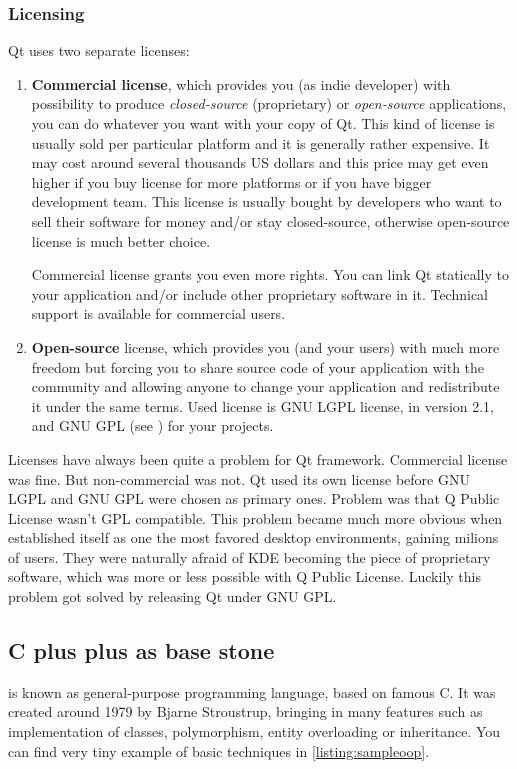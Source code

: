 \subsubsection{Licensing}
Qt uses two separate licenses:
\begin{enumerate}
\item \textbf{Commercial license}, which provides you (as indie developer) with possibility to produce \textit{closed-source} (proprietary) or \textit{open-source} applications, you can do whatever you want with your copy of Qt. This kind of license is usually sold per particular platform and it is generally rather expensive. It may cost around several thousands US dollars and this price may get even higher if you buy license for more platforms or if you have bigger development team. This license is usually bought by developers who want to sell their software for money and/or stay closed-source, otherwise open-source license is much better choice.

Commercial license grants you even more rights. You can link Qt statically to your application and/or include other proprietary software in it. Technical support is available for commercial users.

\item \textbf{Open-source} license, which provides you (and your users) with much more freedom but forcing you to share source code of your application with the community and allowing anyone to change your application and redistribute it under the same terms. Used license is GNU LGPL license, in version 2.1, and GNU GPL (see \citep{stallman:gnugpl}) for your projects.
\end{enumerate}

Licenses have always been quite a problem for Qt framework. Commercial license was fine. But non-commercial was not. Qt used its own license before GNU LGPL and GNU GPL were chosen as primary ones. Problem was that Q Public License wasn't GPL compatible. This problem became much more obvious when  established itself as one the most favored desktop environments, gaining milions of users. They were naturally afraid of KDE becoming the piece of proprietary software, which was more or less possible with Q Public License. Luckily this problem got solved by releasing Qt under GNU GPL.

\subsection{C plus plus as base stone}\label{subsection:cpp}
\cpp is known as general-purpose programming language, based on famous C. It was created around 1979 by Bjarne Stroustrup, bringing in many  features such as implementation of classes, polymorphism, entity overloading or inheritance. You can find very tiny example of basic techniques in \autoref{listing:sampleoop}.

